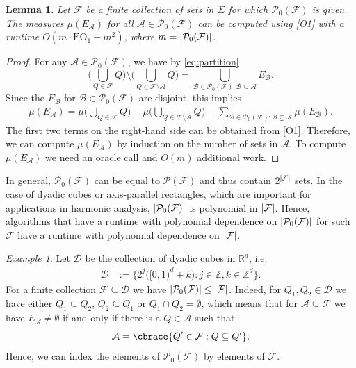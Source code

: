 \documentclass[a4paper, oneside,11pt]{amsart}
\newtheorem{lemma}[theorem]{Lemma}
\theoremstyle{definition}
\theoremstyle{remark}
\newtheorem{example}[theorem]{Example}
\numberwithin{equation}{section}
\newcommand{\Z}{\ensuremath{\mathbb{Z}}}
\newcommand{\R}{\ensuremath{\mathbb{R}}}
\newcommand{\mc}{\mathcal}
\newcommand{\ms}{\mathscr}
\DeclarePairedDelimiter\abs{\lvert}{\rvert}
\DeclarePairedDelimiter\cbrace\{\}
\newcommand{\hab}[1]{\bigl(#1\bigr)}
\newcommand{\cbraceb}[1]{\bigl\{#1\bigr\}}
\newcommand{\bcup}[1]{{\textstyle\bigcup\limits_{#1}}}
\begin{document}
\begin{lemma}\label{lem:measureEA}
Let $\mc{F}$ be a finite collection of sets in $\Sigma$ for which $\mc{P}_0(\mc{F})$ is given.
 The measures $\mu(E_{\mc{A}})$ for all $\mc{A} \in \mc{P}_0(\mc{F})$ can be computed using \emph{\ref{O1}} with a runtime  $O(m\cdot \mathrm{EO}_1+ m^2)$, where  $m = \abs{\mc{P}_0(\mc{F})}$.
\end{lemma}

\begin{proof}
  For any $\mc{A} \in \mc{P}_0(\mc{F})$, we have by \eqref{eq:partition}
  $$
  \hab{\bcup{Q \in \mc{F}} Q}  \setminus \hab{\bcup{Q \in \mc{F} \setminus \mc{A}} Q} = \bigcup_{\mc{B} \in \mc{P}_0({\mc{F}}):\mc{B} \subseteq \mc{A}} E_{\mc{B}}.
  $$
  Since the $E_{\mc{B}}$ for $\mc{B} \in \mc{P}_0(\mc{F})$ are disjoint, this implies
  \begin{align*}
    \mu(E_{\mc{A}}) = \mu\hab{\bcup{Q \in \mc{F}}Q} - \mu\hab{\bcup{Q \in \mc{F}\setminus \mc{A}}Q} - \sum_{\mc{B} \in \mc{P}_0(\mc{F}):\mc{B} \subsetneq\mc{A}} \mu(E_{\mc{B}}).
  \end{align*}
  The first two terms on the right-hand side can be obtained from \ref{O1}.
 Therefore, we can compute $\mu(E_{\mc{A}})$ by induction on the number of sets in $\mc{A}$. To compute   $\mu(E_{\mc{A}})$ we need an oracle call and $O(m)$ additional work.
\end{proof}






 In general, $\mc{P}_0(\mc{F})$ can be equal to $\mc{P}(\mc{F})$ and thus contain $2^{\abs{\mc{F}}}$ sets. In the case of dyadic cubes or axis-parallel rectangles, which are important for applications in harmonic analysis, $\abs{\mc{P}_0(\mc{F})}$  is  polynomial in $\abs{\mc{F}}$. Hence, algorithms that have a runtime with polynomial dependence on $\abs{\mc{P}_0(\mc{F})}$ for such $\mc{F}$ have a runtime with polynomial dependence  on $\abs{\mc{F}}$.

\begin{example}\label{example:cubes}
Let $\ms{D}$ be the collection of dyadic cubes in $\R^d$, i.e.
\begin{align*}
  \ms{D} &:= \cbraceb{2^j\hab{[0,1)^d+k}:j \in \Z,k \in \Z^d}.
\end{align*}
For a finite collection $\mc{F} \subseteq \ms{D}$ we have $\abs{\mc{P}_0(\mc{F})}\leq \abs{\mc{F}}$.
Indeed, for $Q_1,Q_2\in \ms{D}$ we have either $Q_1 \subseteq Q_2$,
$Q_2 \subseteq Q_1$ or $Q_1\cap Q_2 = \emptyset$, which means that for $\mc{A} \subseteq \mc{F}$ we have $E_{\mc{A}} \neq \emptyset $ if and only if there is a $Q \in \mc{A}$ such that  $$\mc{A} = \cbrace{Q' \in \mc{F}:Q\subseteq Q'}.$$
Hence, we can index the elements of $\mc{P}_0(\mc{F})$ by elements of $\mc{F}$.
\end{example}
\end{document}
